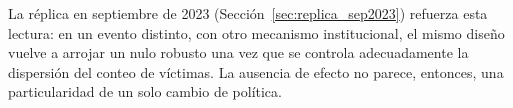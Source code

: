 La réplica en septiembre de 2023 (Sección~\ref{sec:replica_sep2023}) refuerza
esta lectura: en un evento distinto, con otro mecanismo institucional, el mismo
diseño vuelve a arrojar un nulo robusto una vez que se controla adecuadamente la
dispersión del conteo de víctimas. La ausencia de efecto no parece, entonces,
una particularidad de un solo cambio de política.
